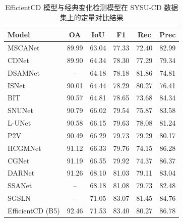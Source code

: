 \begin{table}[!htbp]
  \centering
  \caption{EfficientCD 模型与经典变化检测模型在 SYSU-CD 数据集上的定量对比结果}
  \label{tab:efficientcd_sysu}
  \begin{tabular}{lccccc}
    \toprule
    Model          &   OA   &  IoU   &   F1   &   Rec   &  Prec   \\
    \midrule
    MSCANet~\cite{m_liu_cnn-transformer_2022}        &  89.99 &  63.04 &  77.33 &  72.40  &  82.99  \\
    CDNet~\cite{Alcantarilla2016StreetviewCD}          &  89.90 &  64.34 &  78.30 &  77.29  &  79.34  \\
    DSAMNet~\cite{shi_deeply_2022}        &   --   &  64.18 &  78.18 &  81.86  &  74.81  \\
    ISNet~\cite{Cheng2022ISNetTI}          &  90.01 &  64.44 &  78.29 &  80.27  &  76.41  \\
    BIT~\cite{chen_remote_2022}            &  90.57 &  64.81 &  78.65 &  73.68  &  84.34  \\
    SNUNet~\cite{Fang2021SNUNetCDAD}         &  90.79 &  66.02 &  79.54 &  75.87  &  83.58  \\
    L-UNet~\cite{Papadomanolaki2021ADM}         &  90.58 &  66.15 &  79.63 &  78.08  &  81.24  \\
    P2V~\cite{lin_transition_2023}            &  90.49 &  66.29 &  79.73 &  79.29  &  80.17  \\
    HCGMNet~\cite{Han2023HCGMNetAH}        &  91.12 &  66.33 &  79.76 &  74.15  &  86.28  \\
    CGNet~\cite{han_change_2023}          &  91.19 &  66.55 &  79.92 &  74.37  &  86.37  \\
    DARNet~\cite{li_densely_2022}         &  91.26 &  68.10 &  81.03 &  79.11  &  83.04  \\
    SSANet~\cite{Jiang2022JointVL}         &   --   &  68.18 &  81.08 &  79.73  &  82.48  \\
    SGSLN~\cite{zhao_exchanging_2023}          &   --   &  71.05 &  83.07 &  81.45  &  84.76  \\
    EfficientCD (B5)& 92.46 &  71.53 &  83.40 &  80.27  &  86.78  \\
    \bottomrule
  \end{tabular}
\end{table}


